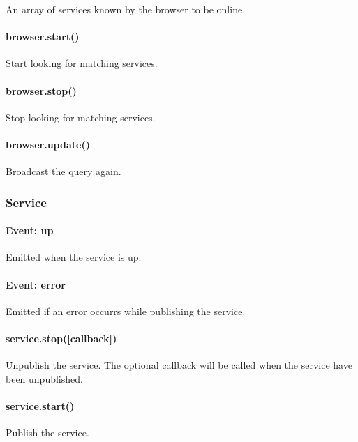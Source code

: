 An array of services known by the browser to be online.

\paragraph*{{\ttfamily browser.\+start()}}

Start looking for matching services.

\paragraph*{{\ttfamily browser.\+stop()}}

Stop looking for matching services.

\paragraph*{{\ttfamily browser.\+update()}}

Broadcast the query again.

\subsubsection*{Service}

\paragraph*{{\ttfamily Event\+: up}}

Emitted when the service is up.

\paragraph*{{\ttfamily Event\+: error}}

Emitted if an error occurrs while publishing the service.

\paragraph*{{\ttfamily service.\+stop(\mbox{[}callback\mbox{]})}}

Unpublish the service. The optional {\ttfamily callback} will be called when the service have been unpublished.

\paragraph*{{\ttfamily service.\+start()}}

Publish the service.

